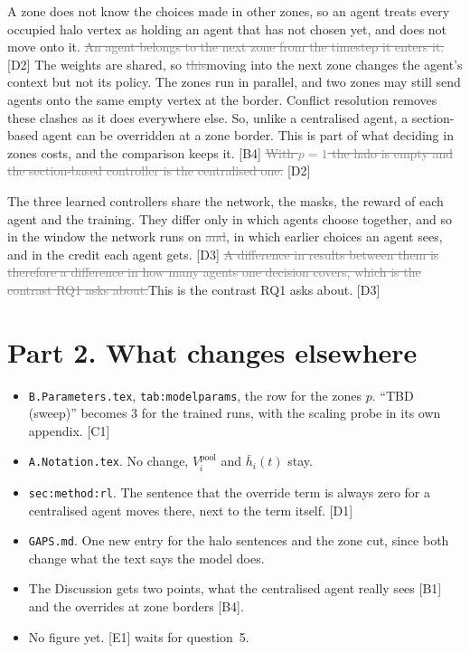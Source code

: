 \documentclass[11pt,a4paper]{article}
\newcommand{\new}[1]{\textcolor{newc}{#1}}
\newcommand{\old}[1]{\textcolor{gray}{\sout{#1}}}
\begin{document}
A zone does not know the choices made in other zones, so an agent treats
every occupied halo vertex as holding an agent that has not chosen yet, and
does not move onto it. \old{An agent belongs to the next zone from the
timestep it enters it.} [D2] The weights are shared, so \old{this}\new{moving
into the next zone} changes the agent's context but not its policy. The
zones run in parallel, and two zones may still send agents onto the same
empty vertex at the border. Conflict resolution removes these clashes as it
does everywhere else. \new{So, unlike a centralised agent, a section-based
agent can be overridden at a zone border. This is part of what deciding in
zones costs, and the comparison keeps it.} [B4] \old{With $p=1$ the halo is
empty and the section-based controller is the centralised one.} [D2]

The three learned controllers share the network, the masks, the reward
\new{of each agent} and the training. They differ only in which agents
choose together, and so in the window the network runs on\old{ and}\new{,} in
which earlier choices an agent sees\new{, and in the credit each agent gets}. [D3] \old{A difference in results between them is therefore
a difference in how many agents one decision covers, which is the contrast
RQ1 asks about.}\new{This is the contrast RQ1 asks about.} [D3]

\section*{Part 2. What changes elsewhere}
\begin{itemize}[nosep]
  \item \texttt{B.Parameters.tex}, \texttt{tab:modelparams}, the row for
        the zones $p$. ``TBD (sweep)'' becomes 3 for the trained runs, with
        the scaling probe in its own appendix. [C1]
  \item \texttt{A.Notation.tex}. No change, $V_i^{\mathrm{pool}}$ and
        $\bar h_i(t)$ stay.
  \item \texttt{sec:method:rl}. The sentence that the override term is
        always zero for a centralised agent moves there, next to the term
        itself. [D1]
  \item \texttt{GAPS.md}. One new entry for the halo sentences and the zone
        cut, since both change what the text says the model does.
  \item The Discussion gets two points, what the centralised agent really
        sees [B1] and the overrides at zone borders [B4].
  \item No figure yet. [E1] waits for question~5.
\end{itemize}
\end{document}
